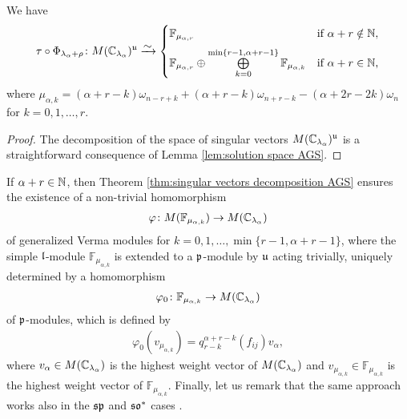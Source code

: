 \begin{theorem}\label{thm:singular vectors decomposition AGS}
We have
\begin{align*}
  \tau \circ \Phi_{\lambda_\alpha+\rho} \colon M(\C_{\lambda_\alpha})^\mfrak{u} \riso
  \begin{cases}
    \mathbb{F}_{\mu_{\alpha,r}} &  \text{if $\alpha+r \notin \N$}, \\[2mm]
    \mathbb{F}_{\mu_{\alpha,r}} \oplus \bigoplus\limits_{k=0}^{\min\{r-1,\alpha+r-1\}} \mathbb{F}_{\mu_{\alpha,k}} & \text{if $\alpha + r \in \N$,}
  \end{cases}
\end{align*}
where $\mu_{\alpha,k}=(\alpha+r-k)\omega_{n-r+k}+(\alpha+r-k)\omega_{n+r-k}-(\alpha+2r-2k)\omega_n$ for $k=0,1,\dots,r$.
\end{theorem}

\begin{proof}The decomposition of the space of singular vectors $M(\mathbb{C}_{\lambda_\alpha})^\mathfrak{u}$ is a straightforward consequence of Lemma \ref{lem:solution space AGS}.
\end{proof}

If $\alpha+r \in \mathbb{N}$, then Theorem \ref{thm:singular vectors decomposition AGS} ensures the existence of a non-trivial homomorphism
\begin{align}
  \varphi \colon M(\mathbb{F}_{\mu_{\alpha,k}}) \rightarrow M(\mathbb{C}_{\lambda_\alpha})
\end{align}
of generalized Verma modules for $k=0,1,\dots,\min\{r-1,\alpha+r-1\}$, where the simple $\mathfrak{l}$-module $\mathbb{F}_{\mu_{\alpha,k}}$ is extended to a $\mathfrak{p}$-module by $\mathfrak{u}$ acting trivially, uniquely determined by a homomorphism
\begin{align}
  \varphi_0 \colon \mathbb{F}_{\mu_{\alpha,k}} \rightarrow M(\mathbb{C}_{\lambda_\alpha})
\end{align}
of $\mathfrak{p}$-modules, which is defined by
\begin{align}
  \varphi_0(v_{\mu_{\alpha,k}})= q^{\alpha+r-k}_{r-k}(f_{ij}) v_\alpha,
\end{align}
where $v_\alpha \in M(\mathbb{C}_{\lambda_\alpha})$ is the highest weight vector of $M(\mathbb{C}_{\lambda_\alpha})$ and $v_{\mu_{\alpha,k}} \in \mathbb{F}_{\mu_{\alpha,k}}$ is the highest weight vector of $\mathbb{F}_{\mu_{\alpha,k}}$. Finally, let us remark that the same approach works also in the $\mathfrak{sp}$ and $\mathfrak{so}^*$ cases \cite{krizka_invariant_2017}. 